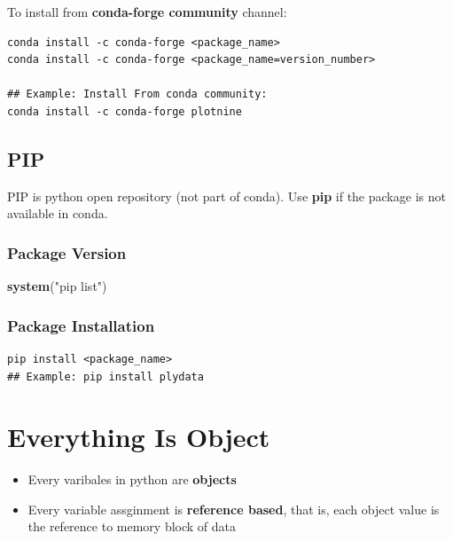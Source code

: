 \documentclass[
]{book}
\newenvironment{Shaded}{\begin{snugshade}}{\end{snugshade}}
\newcommand{\KeywordTok}[1]{\textcolor[rgb]{0.27,0.27,0.27}{\textbf{#1}}}
\newcommand{\NormalTok}[1]{#1}
\newcommand{\StringTok}[1]{\textcolor[rgb]{0.5,0.5,0.5}{#1}}
\providecommand{\tightlist}{%
  \setlength{\itemsep}{0pt}\setlength{\parskip}{0pt}}
\begin{document}
To install from \textbf{conda-forge community} channel:

\begin{verbatim}
conda install -c conda-forge <package_name>
conda install -c conda-forge <package_name=version_number>

## Example: Install From conda community:
conda install -c conda-forge plotnine
\end{verbatim}

\hypertarget{pip}{%
\subsection{PIP}\label{pip}}

PIP is python open repository (not part of conda). Use \textbf{pip} if the package is not available in conda.

\hypertarget{package-version-1}{%
\subsubsection{Package Version}\label{package-version-1}}

\begin{Shaded}
\begin{Highlighting}[]
\KeywordTok{system}\NormalTok{(}\StringTok{"pip list"}\NormalTok{)}
\end{Highlighting}
\end{Shaded}

\hypertarget{package-installation-1}{%
\subsubsection{Package Installation}\label{package-installation-1}}

\begin{verbatim}
pip install <package_name>
## Example: pip install plydata
\end{verbatim}

\hypertarget{everything-is-object}{%
\section{Everything Is Object}\label{everything-is-object}}

\begin{itemize}
\tightlist
\item
  Every varibales in python are \textbf{objects}\\
\item
  Every variable assginment is \textbf{reference based}, that is, each object value is the reference to memory block of data
\end{itemize}
\end{document}

